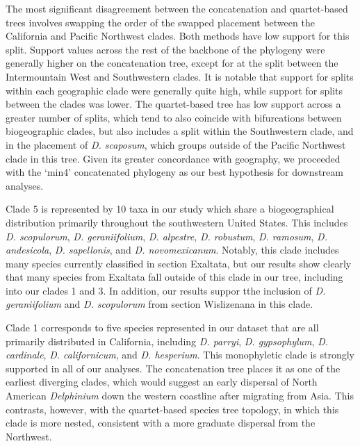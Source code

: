 \documentclass[11pt]{article}
\begin{document}
The most significant disagreement between the concatenation and quartet-based 
trees involves swapping the order of the  swapped placement between the California
and Pacific Northwest clades. Both methods have low support for this split. 
Support values across the rest of the backbone of the phylogeny were 
generally higher on the concatenation tree, except for at the split between the
Intermountain West and Southwestern clades. It is notable that support for splits
within each geographic clade were generally quite high, while support for splits 
between the clades was lower.  The quartet-based tree has low support across a greater
number of splits, which tend to also coincide with bifurcations between biogeographic
clades, but also includes a split within the Southwestern clade, and in the placement
of \emph{D. scaposum}, which groups outside of the Pacific Northwest clade in this
tree. Given its greater concordance with geography, we proceeded with the ‘min4’
concatenated phylogeny as our best hypothesis for downstream analyses.



Clade 5 is represented by 10 taxa in our study which share a biogeographical
distribution primarily throughout the southwestern United States. This 
includes \emph{D. scopulorum}, \emph{D. geraniifolium}, \emph{D. alpestre},
\emph{D. robustum}, \emph{D. ramosum}, \emph{D. andesicola}, \emph{D. sapellonis},
and \emph{D. novomexicanum}. Notably, this clade includes many species 
currently classified in section Exaltata, but our results show clearly that 
many species from Exaltata fall outside of this clade in our tree, including
into our clades 1 and 3. In addition, our results suppor tthe inclusion of 
\emph{D. geraniifolium} and \emph{D. scopulorum} from section Wislizenana
in this clade.



Clade 1 corresponds to five species represented in our dataset that are 
all primarily distributed in California, including \emph{D. parryi}, 
\emph{D. gypsophylum}, \emph{D. cardinale}, \emph{D. californicum}, and
\emph{D. hesperium}. This monophyletic clade is strongly supported in all
of our analyses. The concatenation tree places it as one of the earliest 
diverging clades, which would suggest an early dispersal of North American
\emph{Delphinium} down the western coastline after migrating from Asia. This
contrasts, however, with the quartet-based species tree topology, in which
this clade is more nested, consistent with a more graduate dispersal from the
Northwest. 
\end{document}
